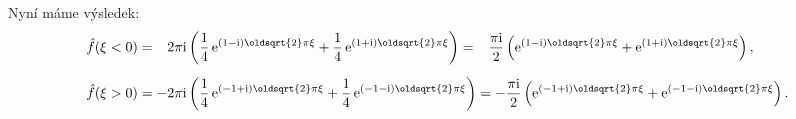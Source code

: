 \documentclass[10pt,a4paper]{article}
\def\ph{\phantom}
\newcommand{\const}[1]{\text{#1}}
\newcommand{\e}[1]{\const{e}^{#1}}
\renewcommand{\i}{\const{i}}
\begin{document}
Nyní máme výsledek:
\begin{align*}
    \hat{f}(\xi < 0) &= \ph{-}2\pi\i \left(
        \frac{1}{4} \, \e{(1-\i)\oldsqrt{2}\pi\xi} +
        \frac{1}{4} \, \e{(1+\i)\oldsqrt{2}\pi\xi}
    \right)
    = \ph{-}\frac{\pi\i}{2} \left( \e{(1-\i)\oldsqrt{2}\pi\xi} + \e{(1+\i)\oldsqrt{2}\pi\xi}\right),
    \\[5pt]
    \hat{f}(\xi > 0) &= -2\pi\i \left(
        \frac{1}{4} \, \e{(-1+\i)\oldsqrt{2}\pi\xi} +
        \frac{1}{4} \, \e{(-1-\i)\oldsqrt{2}\pi\xi}
    \right)
    = -\frac{\pi\i}{2} \left( \e{(-1+\i)\oldsqrt{2}\pi\xi} + \e{(-1-\i)\oldsqrt{2}\pi\xi}\right).
\end{align*}
\end{document}
